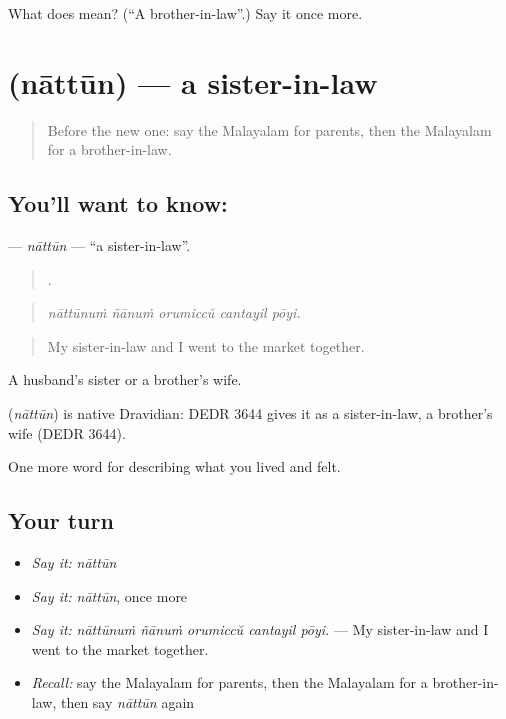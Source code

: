 \begin{tcolorbox}[breakable,colback=teal!4,colframe=teal!35!black,title={Before you move on}]
What does  mean? (\textquotedblleft{}A brother-in-law\textquotedblright{}.) Say it once more.
\end{tcolorbox}
\section[\texorpdfstring{\ml{നാത്തൂൻ} (nāttūn)}{നാത്തൂൻ (nāttūn)}]{ (nāttūn) — a sister-in-law}

\label{lesson:ML-C554-nattun}



\begin{quote}
Before the new one: say the Malayalam for parents, then the Malayalam for a brother-in-law.
\end{quote}

\subsection*{You'll want to know: }
\textbf{} — \emph{nāttūn} — \textquotedblleft{}a sister-in-law\textquotedblright{}.

\begin{quote}
    .
\end{quote}

\begin{quote}
\emph{nāttūnuṁ ñānuṁ orumiccŭ cantayil pōyi.}
\end{quote}

\begin{quote}
My sister-in-law and I went to the market together.
\end{quote}

A husband's sister or a brother's wife.

\begin{cousinweb}
\textbf{} (\emph{nāttūn}) is native Dravidian: DEDR 3644 gives it as a sister-in-law, a brother's wife (DEDR 3644).
\end{cousinweb}

\begin{grammarlens}[title={What you've built}]
One more word for describing what you lived and felt.
\end{grammarlens}

\subsection*{Your turn}
\begin{itemize}
\raggedright
  \item \emph{Say it:} \emph{nāttūn}
  \item \emph{Say it:} \emph{nāttūn}, once more
  \item \emph{Say it:} \emph{nāttūnuṁ ñānuṁ orumiccŭ cantayil pōyi.} — My sister-in-law and I went to the market together.
  \item \emph{Recall:} say the Malayalam for parents, then the Malayalam for a brother-in-law, then say \emph{nāttūn} again
\end{itemize}

